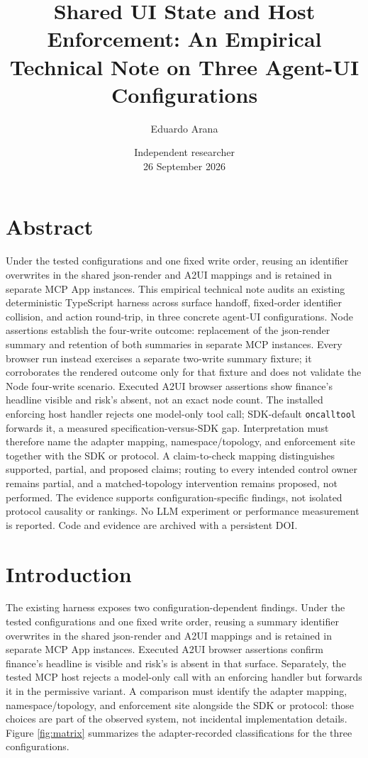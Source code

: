 \documentclass[11pt]{article}
\title{Shared UI State and Host Enforcement: An Empirical Technical Note
on Three Agent-UI Configurations}
\author{Eduardo Arana}
\date{Independent researcher\\[4pt]26 September 2026}
\begin{document}
\maketitle
\section*{Abstract}\label{abstract}

Under the tested configurations and one fixed write order, reusing an
identifier overwrites in the shared json-render and A2UI mappings and is
retained in separate MCP App instances. This empirical technical note
audits an existing deterministic TypeScript harness across surface
handoff, fixed-order identifier collision, and action round-trip, in
three concrete agent-UI configurations. Node assertions establish the
four-write outcome: replacement of the json-render summary and retention
of both summaries in separate MCP instances. Every browser run instead
exercises a separate two-write summary fixture; it corroborates the
rendered outcome only for that fixture and does not validate the Node
four-write scenario. Executed A2UI browser assertions show finance's
headline visible and risk's absent, not an exact node count. The
installed enforcing host handler rejects one model-only tool call;
SDK-default \texttt{oncalltool} forwards it, a measured
specification-versus-SDK gap. Interpretation must therefore name the
adapter mapping, namespace/topology, and enforcement site together with
the SDK or protocol. A claim-to-check mapping distinguishes supported,
partial, and proposed claims; routing to every intended control owner
remains partial, and a matched-topology intervention remains proposed,
not performed. The evidence supports configuration-specific findings,
not isolated protocol causality or rankings. No LLM experiment or
performance measurement is reported. Code and evidence are archived with
a persistent DOI.

\section{Introduction}\label{introduction}

The existing harness exposes two configuration-dependent findings. Under
the tested configurations and one fixed write order, reusing a summary
identifier overwrites in the shared json-render and A2UI mappings and is
retained in separate MCP App instances. Executed A2UI browser assertions
confirm finance's headline is visible and risk's is absent in that
surface. Separately, the tested MCP host rejects a model-only call with
an enforcing handler but forwards it in the permissive variant. A
comparison must identify the adapter mapping, namespace/topology, and
enforcement site alongside the SDK or protocol: those choices are part
of the observed system, not incidental implementation details. Figure
\ref{fig:matrix} summarizes the adapter-recorded classifications for the
three configurations.
\end{document}
